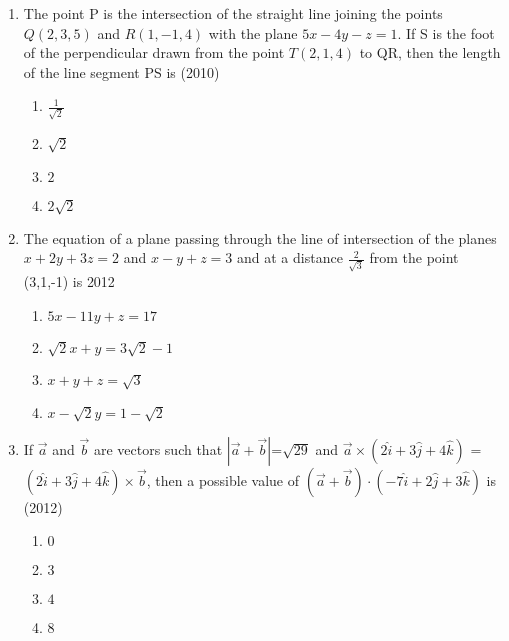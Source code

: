 \documentclass[journal,12pt,twocolumn]{IEEEtran}
\theoremstyle{remark}
\begin{document}
\begin{enumerate}[start=41]
	 \item %
The point P is the intersection of the straight line joining the points $Q(2,3,5)$ and $R(1,-1,4)$ with the plane $5x-4y-z=1$. If S is the foot of the perpendicular drawn from the point $T(2,1,4)$ to QR, then the length of the line segment PS is \hfill{(2010)}\\
\begin{enumerate}
	\item $\frac{1}{\sqrt{2}}$           
	\item $\sqrt{2}$                   
        \item $2$           
	\item $2\sqrt{2}$\\ 
\end{enumerate}
\newpage
         \item %
The equation of a plane passing through the line of intersection of the planes $x+2y+3z=2$ and $x-y+z=3$ and at a distance $\frac{2}{\sqrt{3}}$ from the point (3,1,-1) is \hfill{2012}\\
\begin{enumerate}
        \item $5x-11y+z=17$           
	\item $\sqrt{2}x+y=3\sqrt{2}-1$                   
	\item $x+y+z=\sqrt{3}$           
	\item $x-\sqrt{2}y=1-\sqrt{2}$\\ 
\end{enumerate}

         \item %
		 If $\overrightarrow{a}$ and $\overrightarrow{b}$ are vectors such that $|\overrightarrow{a}+\overrightarrow{b}|$=$\sqrt{29}$ and $\overrightarrow{a}\times(2\hat{i}+3\hat{j}+4\hat{k})$ = $(2\hat{i}+3\hat{j}+4\hat{k})\times\overrightarrow{b}$, then a possible value of $(\overrightarrow{a}+\overrightarrow{b})\cdot(-7\hat{i}+2\hat{j}+3\hat{k})$ is \hfill{(2012)}\\
\begin{enumerate}
        \item $0$                             
        \item $3$                           
        \item $4$            
        \item $8$\\          
\end{enumerate}


\end{enumerate}
\end{document}

